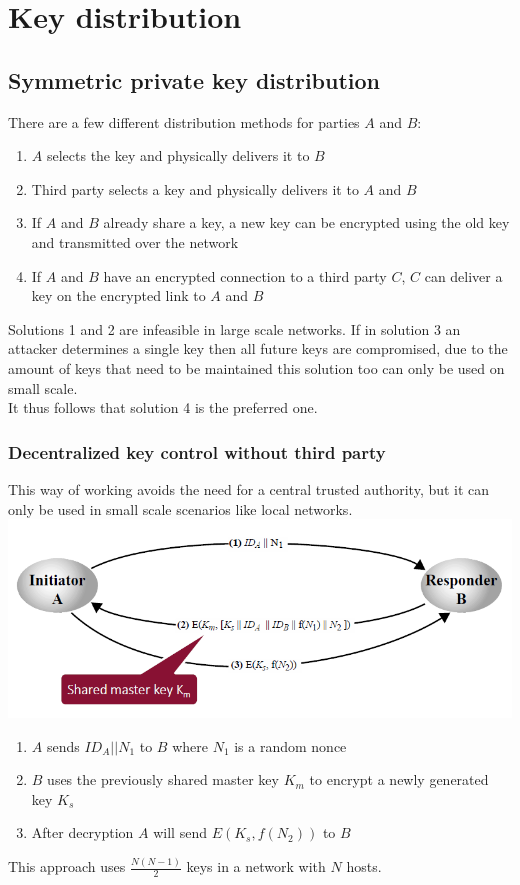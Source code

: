 \documentclass[12pt]{article}
\begin{document}
 \newpage
 \section{Key distribution}
 \subsection{Symmetric private key distribution}
 \noindent{}

 There are a few different distribution methods for parties $A$ and $B$:
 \begin{enumerate}
 	\item $A$ selects the key and physically delivers it to $B$
 	\item Third party selects a key and physically delivers it to $A$ and $B$
 	\item If $A$ and $B$ already share a key, a new key can be encrypted using the old key and transmitted over the network
 	\item If $A$ and $B$ have an encrypted connection to a third party $C$, $C$ can deliver a key on the encrypted link to $A$ and $B$
 \end{enumerate}
 Solutions 1 and 2 are infeasible in large scale networks. If in solution 3 an attacker determines a single key then all future keys are compromised, due to the amount of keys that need to be maintained this solution too can only be used on small scale.\\
 It thus follows that solution 4 is the preferred one.

 \subsubsection{Decentralized key control without third party}
 This way of working avoids the need for a central trusted authority, but it can only be used in small scale scenarios like local networks.\\
 \includegraphics[width=\linewidth]{./slides/L5P1.PNG}
 \begin{enumerate}
 	\item $A$ sends $ID_A||N_1$ to $B$ where $N_1$ is a random nonce
 	\item $B$ uses the previously shared master key $K_m$ to encrypt a newly generated key $K_s$
 	\item After decryption $A$ will send $E(K_s, f(N_2))$ to $B$
 \end{enumerate}
This approach uses $\frac{N(N-1)}{2}$ keys in a network with $N$ hosts.
 
\end{document}
